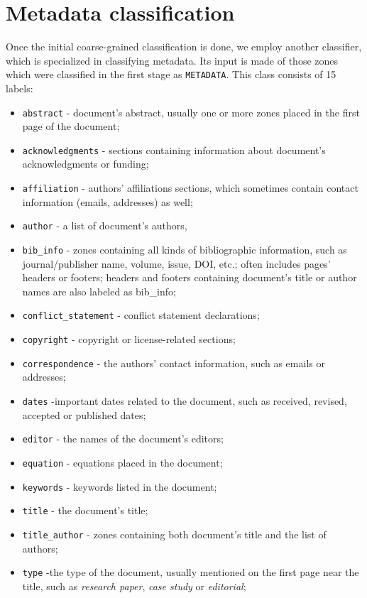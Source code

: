 \section{Metadata classification}
Once the initial coarse-grained classification is done, we employ another classifier, which is specialized in classifying metadata. Its input is made of those zones which were classified in the first stage as \verb+METADATA+. This class consists of 15 labels:
\begin{itemize}
    \item \verb+abstract+ - document's abstract, usually one or more zones placed in the first page of the document;
    \item \verb+acknowledgments+ - sections containing information about document's acknowledgments or funding;
    \item \verb+affiliation+ - authors' affiliations sections, which sometimes contain contact information (emails, addresses) as well;
    \item \verb+author+ - a list of document's authors,
    \item \verb+bib_info+ - zones containing all kinds of bibliographic information, such as journal/publisher name, volume, issue, DOI, etc.; often includes pages' headers or footers; headers and footers containing document's title or author names are also labeled as bib\_info;
    \item \verb+conflict_statement+ - conflict statement declarations;
    \item \verb+copyright+ - copyright or license-related sections;
    \item \verb+correspondence+ - the authors' contact information, such as emails or addresses;
    \item \verb+dates+ -important dates related to the document, such as received, revised, accepted or published dates;
    \item \verb+editor+ - the names of the document's editors;
    \item \verb+equation+ - equations placed in the document;
    \item \verb+keywords+ - keywords listed in the document;
    \item \verb+title+ - the document's title;
    \item \verb+title_author+ - zones containing both document's title and the list of authors;
    \item \verb+type+ -the type of the document, usually mentioned on the first page near the title, such as \textit{research paper}, \textit{case study} or \textit{editorial};
\end{itemize}

